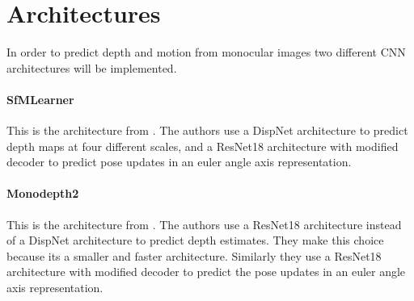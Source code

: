 \section{Architectures}

In order to predict depth and motion from monocular images two different CNN architectures will be implemented.

\paragraph{SfMLearner} This is the architecture from \cite{sfmlearner}. The authors use a DispNet\cite{dispnet} architecture to predict depth maps at four different scales, and a ResNet18\cite{resnet} architecture with modified decoder to predict pose updates in an euler angle axis representation.

\paragraph{Monodepth2} This is the architecture from \cite{monodepth2}. The authors use a ResNet18 architecture instead of a DispNet architecture to predict depth estimates. They make this choice because its a smaller and faster architecture. Similarly they use a ResNet18 architecture with modified decoder to predict the pose updates in an euler angle axis representation.